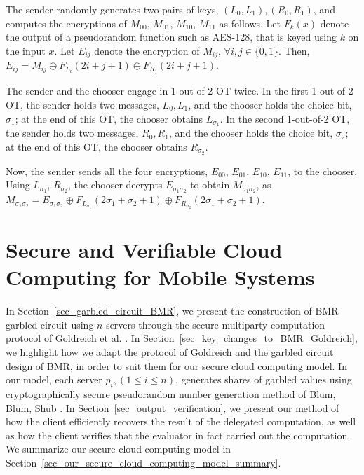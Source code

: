 \documentclass[10pt,journal,cspaper,compsoc]{IEEEtran}
\begin{document}
The sender randomly generates two pairs of keys, $(L_0,L_1),(R_0,R_1)$, and computes the encryptions of $M_{00}$, $M_{01}$, $M_{10}$, $M_{11}$ as follows. Let $F_k (x)$ denote the output of a pseudorandom function such as AES-128, that is keyed using $k$ on the input $x$. Let $E_{ij}$ denote the encryption of $M_{ij}$, $\forall i,j\in\{0,1\}$. Then, $E_{ij}=M_{ij}\oplus F_{L_i}(2i+j+1)\oplus F_{R_j}(2i+j+1)$.


The sender and the chooser engage in 1-out-of-2 OT twice. In the first 1-out-of-2 OT, the sender holds two messages, $L_0,L_1$, and the chooser holds the choice bit, $\sigma_1$; at the end of this OT, the chooser obtains $L_{\sigma_1}$. In the second 1-out-of-2 OT, the sender holds two messages, $R_0,R_1$, and the chooser holds the choice bit, $\sigma_2$; at the end of this OT, the chooser obtains $R_{\sigma_2}$.


Now, the sender sends all the four encryptions, $E_{00}$, $E_{01}$, $E_{10}$, $E_{11}$, to the chooser. Using $L_{\sigma_1}$, $R_{\sigma_2}$, the chooser decrypts $E_{\sigma_1 \sigma_2}$ to obtain $M_{\sigma_1 \sigma_2}$, as $M_{\sigma_1 \sigma_2}=E_{\sigma_1 \sigma_2}\oplus F_{L_{\sigma_1}}(2\sigma_1+\sigma_2+1)\oplus F_{R_{\sigma_2}}(2\sigma_1+\sigma_2+1)$.

 \section{Secure and Verifiable Cloud Computing for Mobile Systems}
\label{sec_our_cloud_computing_model}

In Section~\ref{sec_garbled_circuit_BMR}, we present the construction of BMR garbled circuit \cite{beaver90,rogaway91} using $n$ servers through the secure multiparty computation protocol of Goldreich et al. \cite{goldreich04,goldreich87}. In Section~\ref{sec_key_changes_to_BMR_Goldreich}, we highlight how we adapt the protocol of Goldreich and the garbled circuit design of BMR, in order to suit them for our secure cloud computing model. In our model, each server $p_i, (1\le i\le n)$, generates shares of garbled values using cryptographically secure pseudorandom number generation method of Blum, Blum, Shub \cite{blum86,schneier95}. In Section~\ref{sec_output_verification}, we present our method of how the client efficiently recovers the result of the delegated computation, as well as how the client verifies that the evaluator in fact carried out the computation. We summarize our secure cloud computing model in Section~\ref{sec_our_secure_cloud_computing_model_summary}.
\end{document}
